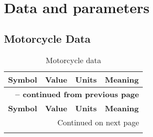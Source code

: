 \chapter{Data and parameters}
%
\section{Motorcycle Data}
\label{app:MotoData}
%    
\begin{longtable}{clcl}
    \caption{Motorcycle data} \label{tab:MotoData} \\
    \hline \multicolumn{1}{c}{\textbf{Symbol}} & \multicolumn{1}{c}{\textbf{Value}} & \multicolumn{1}{c}{\textbf{Units}} & \multicolumn{1}{c}{\textbf{Meaning}} \\ \hline
    \endfirsthead

    \multicolumn{4}{c}{{\bfseries \tablename\ \thetable{} -- continued from previous page}} \\
    \hline \multicolumn{1}{c}{\textbf{Symbol}} & \multicolumn{1}{c}{\textbf{Value}} & \multicolumn{1}{c}{\textbf{Units}} & \multicolumn{1}{c}{\textbf{Meaning}} \\ \hline
    \endhead

    \hline \multicolumn{4}{r}{{Continued on next page}} \\ \hline
    \endfoot


\end{longtable}
